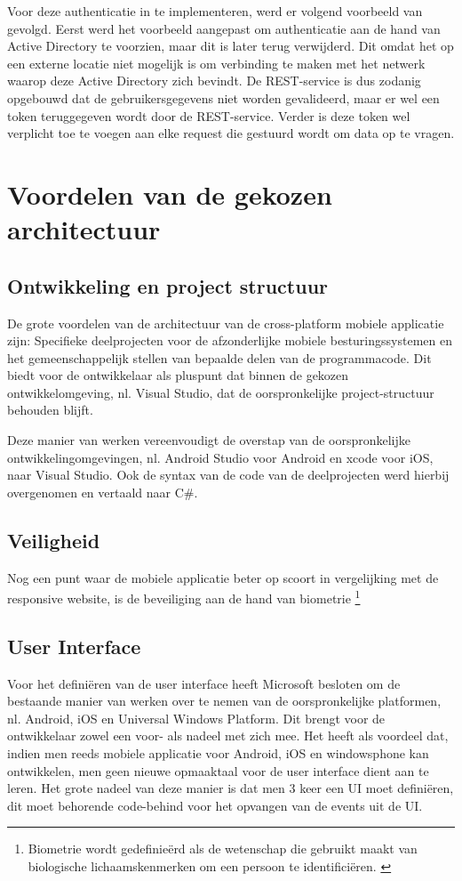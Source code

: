 Voor deze authenticatie in te implementeren, werd er volgend voorbeeld van \cite{authenticatemvcapplication2017} gevolgd.
Eerst werd het voorbeeld aangepast om authenticatie aan de hand van Active Directory te voorzien, maar dit is later terug verwijderd.
Dit omdat het op een externe locatie niet mogelijk is om verbinding te maken met het netwerk waarop deze Active Directory zich bevindt.
De REST-service is dus zodanig opgebouwd dat de gebruikersgegevens niet worden gevalideerd, maar er wel een token teruggegeven wordt door de REST-service.
Verder is deze token wel verplicht toe te voegen aan elke request die gestuurd wordt om data op te vragen.

\label{sec:voordelenvandegekozenapparchitectuur}
\section{Voordelen van de gekozen architectuur}
\subsection{Ontwikkeling en project structuur}
De grote voordelen van de architectuur van de cross-platform mobiele applicatie zijn: Specifieke deelprojecten voor de afzonderlijke
mobiele besturingssystemen en het gemeenschappelijk stellen van bepaalde delen van de programmacode. Dit biedt voor de ontwikkelaar
als pluspunt dat binnen de gekozen ontwikkelomgeving, nl. Visual Studio, dat de oorspronkelijke project-structuur behouden blijft.

Deze manier van werken vereenvoudigt de overstap van de oorspronkelijke ontwikkelingomgevingen, nl. Android Studio voor Android en xcode voor iOS, naar Visual Studio.
Ook de syntax van de code van de deelprojecten werd hierbij overgenomen en vertaald naar C\#.

\subsection{Veiligheid}
Nog een punt waar de mobiele applicatie beter op scoort in vergelijking met de responsive website, is de beveiliging aan de hand van biometrie \footnote{Biometrie wordt gedefinieërd als de wetenschap die gebruikt maakt van biologische lichaamskenmerken om een persoon te identificiëren. \citep{davidcheklingngoandrewbengjinteohjiankunhu2015}}


\subsection{User Interface}
Voor het definiëren van de user interface heeft Microsoft besloten om de bestaande manier van werken over te nemen van de oorspronkelijke platformen, nl. Android, iOS en Universal Windows Platform.
Dit brengt voor de ontwikkelaar zowel een voor- als nadeel met zich mee. Het heeft als voordeel dat, indien men reeds mobiele applicatie voor Android, iOS en windowsphone kan ontwikkelen, men geen
nieuwe opmaaktaal voor de user interface dient aan te leren. Het grote nadeel van deze manier is dat men 3 keer een UI moet definiëren,
dit moet behorende code-behind voor het opvangen van de events uit de UI.

